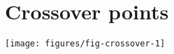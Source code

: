 \documentclass[a4paper,11pt]{article}\usepackage[]{graphicx}\usepackage[]{color}
\makeatletter
\def\maxwidth{ %
  \ifdim\Gin@nat@width>\linewidth
    \linewidth
  \else
    \Gin@nat@width
  \fi
}
\newenvironment{knitrout}{}{} %
\makeatother
\begin{document}
\clearpage
\section{Crossover points}
\begin{knitrout}
\color{fgcolor}

{\centering \texttt{[image: figures/fig-crossover-1]} 

}



\end{knitrout}
\end{document}
